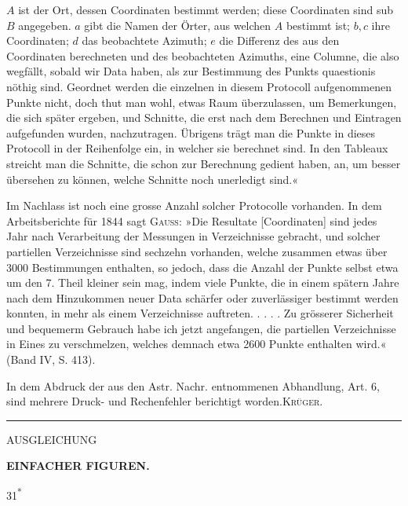 {\(A\) ist der Ort, dessen Coordinaten bestimmt werden; diese Coordinaten sind sub \(B\) angegeben. \(a\) gibt die Namen der Örter, aus welchen \(A\) bestimmt ist; \(b,c\) ihre Coordinaten; \(d\) das beobachtete Azimuth; \(e\) die Differenz des aus den Coordinaten berechneten und des beobachteten Azimuths, eine Columne, die also wegfällt, sobald wir  Data haben, als zur Bestimmung des Punkts quaestionis nöthig sind. Geordnet werden die einzelnen in diesem Protocoll aufgenommenen Punkte nicht, doch thut man wohl, etwas Raum überzulassen, um Bemerkungen, die sich später ergeben, und Schnitte, die erst nach dem Berechnen und Eintragen aufgefunden wurden, nachzutragen. Übrigens trägt man die Punkte in dieses Protocoll in der Reihenfolge ein, in welcher sie berechnet sind. In den Tableaux streicht man die Schnitte, die schon zur Berechnung gedient haben, an, um besser übersehen zu können, welche Schnitte noch unerledigt sind.«

Im Nachlass ist noch eine grosse Anzahl solcher Protocolle vorhanden. In dem Arbeitsberichte für 1844 sagt \textsc{Gauss}: »Die Resultate [Coordinaten] sind jedes Jahr nach Verarbeitung der Messungen in Verzeichnisse gebracht, und solcher partiellen Verzeichnisse sind sechzehn vorhanden, welche zusammen etwas über 3000 Bestimmungen enthalten, so jedoch, dass die Anzahl der Punkte selbst etwa um den 7. Theil kleiner sein mag, indem viele Punkte, die in einem spätern Jahre nach dem Hinzukommen neuer Data schärfer oder zuverlässiger bestimmt werden konnten, in mehr als einem Verzeichnisse auftreten. . . . . Zu grösserer Sicherheit und bequemerm Gebrauch habe ich jetzt angefangen, die partiellen Verzeichnisse in Eines zu verschmelzen, welches demnach etwa 2600 Punkte enthalten wird.« (Band IV, S. 413).

In dem Abdruck der aus den Astr. Nachr. entnommenen Abhandlung, Art. 6, sind mehrere Druck- und Rechenfehler berichtigt worden.\hfill\textsc{Krüger.}\par
\begin{center}\rule{4cm}{.4pt}\end{center}
}

\par\clearpage

\thispagestyle{empty}
\vspace*{.23\textheight}
{\centering
{\LARGE AUSGLEICHUNG\par}
\medskip
{\LARGE\bfseries EINFACHER FIGUREN.\par}
}
\vfill
\noindent\hfill31\textsuperscript{*}\hspace*{.15\linewidth}\par
\vspace*{.14\textheight}

